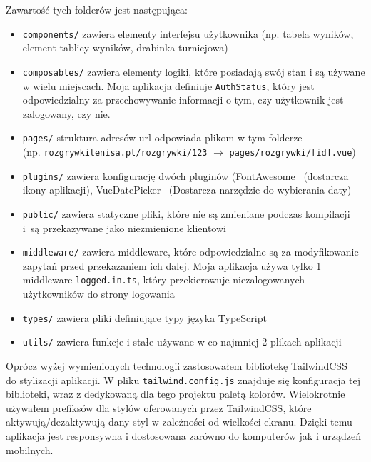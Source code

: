 \documentclass[shortabstract]{iithesis}
\begin{document}
\noindent
Zawartość tych folderów jest następująca:
\begin{itemize}
    \item \texttt{components/} zawiera elementy interfejsu użytkownika (np. tabela wyników, element tablicy wyników, drabinka turniejowa)
    \item \texttt{composables/} zawiera elementy logiki, które posiadają swój stan i są używane w wielu miejscach. Moja aplikacja definiuje \texttt{AuthStatus}, który jest odpowiedzialny za przechowywanie informacji o tym, czy użytkownik jest zalogowany, czy nie.
    \item \texttt{pages/} struktura adresów url odpowiada plikom w tym folderze\\(np. \texttt{rozgrywkitenisa.pl/rozgrywki/123} $\longrightarrow$ \texttt{pages/rozgrywki/[id].vue})
    \item \texttt{plugins/} zawiera konfigurację dwóch pluginów (FontAwesome~\cite{FontAwesome} (dostarcza ikony aplikacji), VueDatePicker~\cite{VueDatePicker} (Dostarcza narzędzie do wybierania daty)
    \item \texttt{public/} zawiera statyczne pliki, które nie są zmieniane podczas kompilacji i~są przekazywane jako niezmienione klientowi
    \item \texttt{middleware/} zawiera middleware, które odpowiedzialne są za modyfikowanie zapytań przed przekazaniem ich dalej. Moja aplikacja używa tylko 1 middleware \texttt{logged.in.ts}, który przekierowuje niezalogowanych użytkowników do strony logowania
    \item \texttt{types/} zawiera pliki definiujące typy języka TypeScript
    \item \texttt{utils/} zawiera funkcje i stałe używane w co najmniej 2 plikach aplikacji
\end{itemize}
Oprócz wyżej wymienionych technologii zastosowałem bibliotekę TailwindCSS~\cite{TailwindCSS} do stylizacji aplikacji.
W pliku \texttt{tailwind.config.js} znajduje się konfiguracja tej biblioteki, wraz z dedykowaną dla tego projektu paletą kolorów.
Wielokrotnie używałem prefiksów dla stylów oferowanych przez TailwindCSS, które aktywują/dezaktywują dany styl w zależności od wielkości ekranu.
Dzięki temu aplikacja jest responsywna i dostosowana zarówno do komputerów jak i urządzeń mobilnych.
\end{document}
